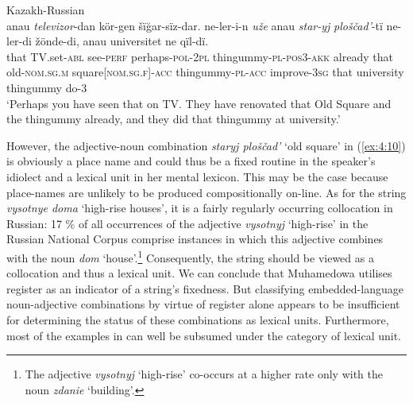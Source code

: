 \ea{\label{ex:4:10}}
Kazakh-Russian \citep[82]{muhamedowa-untersuchung-2006}\\
\gll anau \textit{televizor}-dan kör-gen šïğar-sïz-dar. ne-ler-i-n \textit{uže} anau \textit{star-yj} \textit{ploščad'}-tï ne-ler-di žönde-di, anau universitet ne qïl-dï.\\
	that {TV.set}-\textsc{abl} see-\textsc{perf} perhaps-\textsc{pol-2pl} thingummy-\textsc{pl-pos3-akk} already that old-\textsc{nom.sg.m} square[\textsc{nom.sg.f}]-\textsc{acc} thingummy-\textsc{pl-acc} improve-\textsc{3sg} that university thingummy do-\textsc{3}\\
\glt `Perhaps you have seen that on TV. They have renovated that Old Square and the thingummy already, and they did that thingummy at university.'
\z

\noindent However, the adjective-noun combination \textit{staryj ploščad'} `old square' in (\ref{ex:4:10}) is obviously a place name and could thus be a fixed routine in the speaker's idiolect and a lexical unit in her mental lexicon. This may be the case because place-names are unlikely to be produced compositionally on-line. As for the string \textit{vysotnye doma} `high-rise houses', it is a fairly regularly occurring collocation in Russian: 17 \% of all occurrences of the adjective \textit{vysotnyj} `high-rise' in the Russian National Corpus comprise instances in which this adjective combines with the noun \textit{dom} `house'.\footnote{The adjective \textit{vysotnyj} `high-rise' co-occurs at a higher rate only with the noun \textit{zdanie} `building'.} Consequently, the string should be viewed as a  collocation and thus a lexical unit. We can conclude that Muhamedowa utilises register as an indicator of a string's fixedness. But classifying embedded-language noun-adjective combinations by virtue of register alone appears to be insufficient for determining the status of these combinations as lexical units. Furthermore, most of the examples in \citet[81--88]{muhamedowa-untersuchung-2006} can well be subsumed under the category of lexical unit. 

